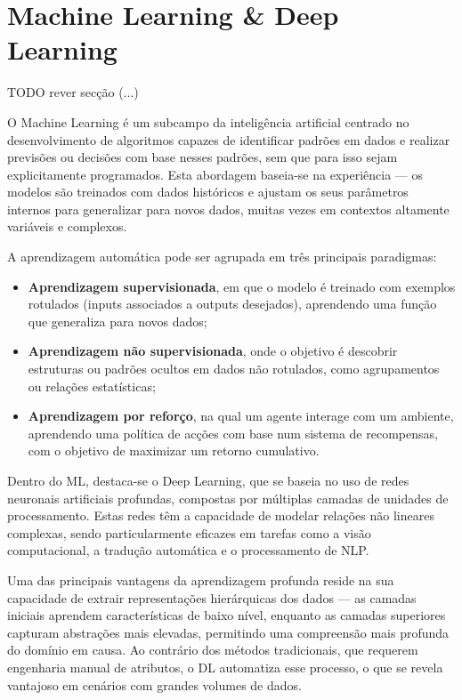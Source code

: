 \section{Machine Learning \& Deep Learning}

TODO rever secção (...)

O Machine Learning é um subcampo da inteligência artificial centrado no desenvolvimento de algoritmos capazes de identificar padrões em dados e realizar previsões ou decisões com base nesses padrões, sem que para isso sejam explicitamente programados. Esta abordagem baseia-se na experiência — os modelos são treinados com dados históricos e ajustam os seus parâmetros internos para generalizar para novos dados, muitas vezes em contextos altamente variáveis e complexos.

A aprendizagem automática pode ser agrupada em três principais paradigmas:
\begin{itemize}
    \item \textbf{Aprendizagem supervisionada}, em que o modelo é treinado com exemplos rotulados (inputs associados a outputs desejados), aprendendo uma função que generaliza para novos dados;
    \item \textbf{Aprendizagem não supervisionada}, onde o objetivo é descobrir estruturas ou padrões ocultos em dados não rotulados, como agrupamentos ou relações estatísticas;
    \item \textbf{Aprendizagem por reforço}, na qual um agente interage com um ambiente, aprendendo uma política de acções com base num sistema de recompensas, com o objetivo de maximizar um retorno cumulativo.
\end{itemize}

Dentro do ML, destaca-se o Deep Learning, que se baseia no uso de redes neuronais artificiais profundas, compostas por múltiplas camadas de unidades de processamento. Estas redes têm a capacidade de modelar relações não lineares complexas, sendo particularmente eficazes em tarefas como a visão computacional, a tradução automática e o processamento de NLP.

Uma das principais vantagens da aprendizagem profunda reside na sua capacidade de extrair representações hierárquicas dos dados — as camadas iniciais aprendem características de baixo nível, enquanto as camadas superiores capturam abstrações mais elevadas, permitindo uma compreensão mais profunda do domínio em causa. Ao contrário dos métodos tradicionais, que requerem engenharia manual de atributos, o DL automatiza esse processo, o que se revela vantajoso em cenários com grandes volumes de dados.


